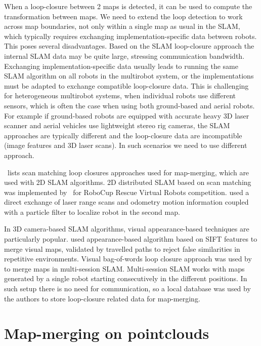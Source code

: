 When a loop-closure between 2 maps is detected, it can be used to compute the transformation between maps. We need to extend the loop detection to work across map boundaries, not only within a single map as usual in the \gls{SLAM}, which typically requires exchanging implementation-specific data between robots. This poses several disadvantages. Based on the \gls{SLAM} loop-closure approach the internal \gls{SLAM} data may be quite large, stressing communication bandwidth. Exchanging implementation-specific data usually leads to running the same \gls{SLAM} algorithm on all robots in the multirobot system, or the implementations must be adapted to exchange compatible loop-closure data. This is challenging for heterogeneous multirobot systems, when individual robots use different sensors, which is often the case when using both ground-based and aerial robots. For example if ground-based robots are equipped with accurate heavy 3D laser scanner and aerial vehicles use lightweight stereo rig cameras, the \gls{SLAM} approaches are typically different and the loop-closure data are incompatible (image features and 3D laser scans). In such scenarios we need to use different approach.

\cite{lee2012survey}~lists scan matching loop closures approaches used for map-merging, which are used with 2D \gls{SLAM} algorithms. 2D distributed \gls{SLAM} based on scan matching was implemented by~\cite{pfingsthorn2007scalable} for RoboCup Rescue Virtual Robots competition. \cite{fox2006distributed} used a direct exchange of laser range scans and odometry motion information coupled with a particle filter to localize robot in the second map.

In 3D camera-based \gls{SLAM} algorithms, visual appearance-based techniques are particularly popular. \cite{tomono2013merging} used appearance-based algorithm based on \gls{SIFT} features to merge visual maps, validated by travelled paths to reject false similarities in repetitive environments. Visual bag-of-words loop closure approach was used by~\cite{labbe2014online} to merge maps in multi-session \gls{SLAM}. Multi-session \gls{SLAM} works with maps generated by a single robot starting consecutively in the different positions. In such setup there is no need for communication, so a local database was used by the authors to store loop-closure related data for map-merging.

\section{Map-merging on pointclouds}


